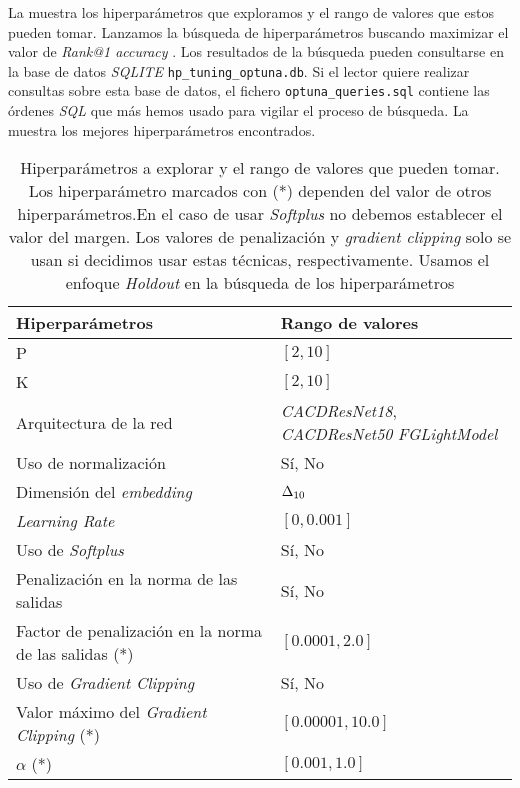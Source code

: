 La  muestra los hiperparámetros que exploramos y el rango de valores que estos pueden tomar. Lanzamos la búsqueda de hiperparámetros buscando maximizar el valor de \textit{Rank@1 accuracy} \footnotemark. Los resultados de la búsqueda pueden consultarse en la base de datos \textit{SQLITE} \lstinline{hp_tuning_optuna.db}. Si el lector quiere realizar consultas sobre esta base de datos, el fichero \lstinline{optuna_queries.sql} contiene las órdenes \textit{SQL} que más hemos usado para vigilar el proceso de búsqueda. La  muestra los mejores hiperparámetros encontrados.

\begin{table}[!hbt]
\centering
    \begin{tabular}{|l|p{5cm}|}
    \hline
    \textbf{Hiperparámetros} & \textbf{Rango de valores} \\
    \hline

    P & $[2, 10]$ \\
    K & $[2, 10]$ \\
    Arquitectura de la red & \textit{CACDResNet18}, \textit{CACDResNet50} \textit{FGLightModel} \\
    Uso de normalización & Sí, No \\
    Dimensión del \textit{embedding} & $\Delta_{10}$ \\
    \textit{Learning Rate} & $[0, 0.001]$ \\
    Uso de \textit{Softplus} & Sí, No \\
    Penalización en la norma de las salidas & Sí, No \\
    Factor de penalización en la norma de las salidas (*) & $[0.0001, 2.0]$ \\
    Uso de \textit{Gradient Clipping} & Sí, No \\
    Valor máximo del \textit{Gradient Clipping} (*) & $[0.00001, 10.0]$ \\
    $\alpha$ (*) & $[0.001, 1.0]$ \\

    \hline

\end{tabular}
\caption{Hiperparámetros a explorar y el rango de valores que pueden tomar. Los hiperparámetro marcados con (*) dependen del valor de otros hiperparámetros.En el caso de usar \textit{Softplus} no debemos establecer el valor del margen. Los valores de penalización y \textit{gradient clipping} solo se usan si decidimos usar estas técnicas, respectivamente. Usamos el enfoque \textit{Holdout} en la búsqueda de los hiperparámetros}
\label{table:rangos_hiperparametros}
\end{table}


